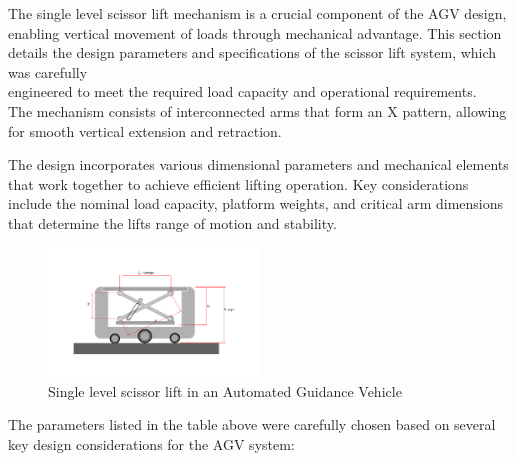 \documentclass[../../main]{subfiles}
\begin{document}
The single level scissor lift mechanism is a crucial component of the
AGV design,\\ enabling vertical movement of loads through mechanical
advantage. This section details the design parameters and specifications
of the scissor lift system, which was carefully\\ engineered to meet the
required load capacity and operational requirements.\\The mechanism
consists of interconnected arms that form an
\textquotesingle X\textquotesingle{} pattern, allowing for smooth
vertical extension and retraction.

The design incorporates various dimensional parameters and mechanical
elements that work together to achieve efficient lifting operation. Key
considerations include the nominal load capacity, platform weights, and
critical arm dimensions that determine the lift\textquotesingle s range
of motion and stability.

\begin{figure}[h]
\centering
\includegraphics[width=0.5\textwidth]{img/image003.png}
\caption{Single level scissor lift in an Automated Guidance Vehicle}
\end{figure}
\newpage
The parameters listed in the table above were carefully chosen based on
several key design considerations for the AGV system:
\end{document}
